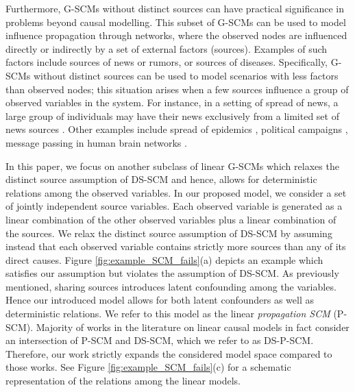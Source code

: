\documentclass[12pt]{article}
\begin{document}
Furthermore, G-SCMs without distinct sources can have practical significance in problems beyond causal modelling. This subset of G-SCMs can be used to model influence propagation through networks, where the observed nodes are influenced directly or indirectly by a set of external factors (sources). Examples of such factors include sources of news or rumors, or sources of diseases.
Specifically, G-SCMs without distinct sources can be used to model scenarios with less factors than observed nodes; 
this situation arises when a few sources influence a group of observed variables in the system. For instance, in a setting of spread of news, a large group of individuals may have their news exclusively from a limited set of news sources \citep{guille2013information, quinn2015directed}. 
Other examples include spread of epidemics \citep{nowzari2016analysis}, political campaigns \citep{gonzalez2016networked}, message passing in human brain networks \citep{karwowski2019application}.

In this paper, we focus on another subclass of linear G-SCMs which relaxes the distinct source assumption of DS-SCM and hence, allows for deterministic relations among the observed variables. In our proposed model, we consider a set of jointly independent source variables. Each observed variable is generated as a linear combination of the other observed variables plus a linear combination of the sources.
 We relax the distinct source assumption of DS-SCM by assuming instead that each observed variable contains strictly more sources than any of its direct causes. Figure \ref{fig:example_SCM_fails}(a) depicts an example which satisfies our assumption but violates the assumption of DS-SCM.
As previously mentioned, sharing sources introduces latent confounding among the variables. Hence our introduced model allows for both latent confounders as well as deterministic relations. We refer to this model as the linear \emph{propagation SCM} (P-SCM). 
Majority of works in the literature on linear causal models in fact consider an intersection of P-SCM and DS-SCM, %
which we refer to as DS-P-SCM.
Therefore, our work strictly expands the considered model space compared to those works. See Figure \ref{fig:example_SCM_fails}(c) for a schematic representation of the relations among the linear models. 
\end{document}
